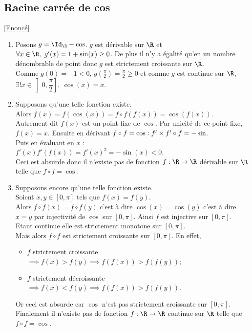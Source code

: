 \documentclass{book}
\begin{document}
	\subsection{Racine carrée de cos }
	\label{Racine carrée de cos corrigé}
	\textcolor{blue}{\hyperref[Racine carrée de cos]{[Enoncé]}}\\
	\begin{enumerate}[leftmargin=*]
		\item Posons $g=\Id_\R-\cos$. $g$ est dérivable sur $\R$ et $\forall x\in \R,\ g'(x)=1+\sin(x)\geq 0$. De plus il n'y a égalité qu'en un nombre dénombrable de point donc $g$ est strictement croissante sur $\R$.\\
		Comme $g(0)=-1<0$, $\displaystyle g\left(\frac{\pi}{2}\right)=\frac{\pi}{2}\geq 0$ et comme $g$ est continue sur $\R$, $\exists!x\in \left]0,\dfrac{\pi}{2}\right],\ \cos(x)=x$.
		\item Supposons qu'une telle fonction existe.\\
		Alors $f(x)=f(\cos(x))=f\circ f(f(x))=\cos(f(x))$.\\
		Autrement dit $f(x)$ est un point fixe de $\cos$. Par unicité de ce point fixe, $f(x)=x$.
		Ensuite en dérivant $f\circ f=\cos :\\
		f'\times f'\circ f=-\sin$.\\
		Puis en évaluant en $x$ :\\
		$f'(x)f'(f(x))=f'(x)^2=-\sin(x)<0$.\\
		Ceci est absurde donc il n'existe pas de fonction $f:\R\to \R$ dérivable sur $\R$ telle que $f\circ f=\cos$.
		\item Supposons encore qu'une telle fonction existe.\\
		Soient $x,y\in [0,\pi]$ tels que $f(x)=f(y)$.\\
		Alors $f\circ f(x)=f\circ f(y)$ c'est à dire $\cos(x)=\cos(y)$ c'est à dire $x=y$ par injectivité de $\cos$ sur $[0,\pi]$. Ainsi $f$ est injective sur $[0,\pi]$. Etant continue elle est strictement monotone sur $[0,\pi]$.\\
		Mais alors $f\circ f$ est strictement croissante sur $[0,\pi]$. En effet,
		\begin{itemize}
			\item $f$ strictement croissante $\implies f(x)>f(y)\implies f(f(x))>f(f(y))$;
			\item $f$ strictement décroissante $\implies f(x)<f(y)\implies f(f(x))>f(f(y))$.
		\end{itemize}
		Or ceci est absurde car $\cos$ n'est pas strictement croissante sur $[0,\pi]$.\\
		Finalement il n'existe pas de fonction $f:\R\to \R$ continue sur $\R$ telle que $f\circ f=\cos$.
	\end{enumerate}
	
\end{document}
